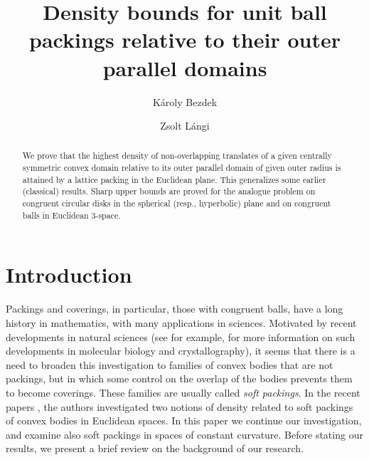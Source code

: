 \documentclass[11pt]{amsart}
\title[Truncated density bounds for unit ball packings]{Density bounds for unit ball packings relative to their outer parallel domains}
\author[K. Bezdek]{K\'{a}roly Bezdek}
\author[Z. L\'angi]{Zsolt L\'angi}
\date{}
\theoremstyle{definition}
\numberwithin{equation}{section}
\begin{document}
\begin{abstract}
We prove that the highest density of non-overlapping translates of a given centrally symmetric convex domain relative to its outer parallel domain of given outer radius is attained by a lattice packing in the Euclidean plane. This generalizes some earlier (classical) results. Sharp upper bounds are proved for the analogue problem on congruent circular disks in the spherical (resp., hyperbolic) plane and on congruent balls in Euclidean $3$-space.
\end{abstract}

\maketitle


\section{Introduction}
 
 Packings and coverings, in particular, those with congruent balls, have a long history in mathematics, with many applications in sciences. Motivated by recent developments in natural sciences (see for example, \cite{edelsbrunner, senechal} for more information on such developments in molecular biology and crystallography), it seems that there is a need to broaden this investigation to families of convex bodies that are not packings, but in which some control on the overlap of the bodies prevents them to become coverings. These families are usually called \emph{soft packings}. In the recent papers \cite{Be-La-2015, Be-La-2024}, the authors investigated two notions of density related to soft packings of convex bodies in Euclidean spaces. In this paper we continue our investigation, and examine also soft packings in spaces of constant curvature. Before stating our results, we present a brief review on the background of our research.
\end{document}

